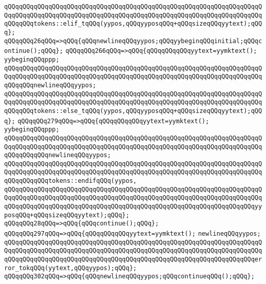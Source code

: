 \verb|qQQqqQQqqQQqqQQqqQQqqQQqqQQqqQQqqQQqqQQqqQQqqQQqqQQqqQQqqQQqqQQqqQQqqQQqqQQqqQQqqQQqqQQqqQQqqQQqqQQqqQQqqQQqqQQqqQQqqQQqqQQqqQQqqQQqqQQqqQQqqQQqqQQqtokens::elif_tqQQq(yypos,qQQqyyposqQQq+qQQqsizeqQQqyytext);qQQq};|\newline
\verb|qQQqqQQq26qQQq=>qQQq{qQQqnewlineqQQqyypos;qQQqyybeginqQQqinitial;qQQqcontinue();qQQq};|\newline
\verb|qQQqqQQq266qQQq=>qQQq{qQQqqQQqqQQqyytext=yymktext();|\newline
\verb|yybeginqQQqppp;|\newline
\verb|qQQqqQQqqQQqqQQqqQQqqQQqqQQqqQQqqQQqqQQqqQQqqQQqqQQqqQQqqQQqqQQqqQQqqQQqqQQqqQQqqQQqqQQqqQQqqQQqqQQqqQQqqQQqqQQqqQQqqQQqqQQqqQQqqQQqqQQqqQQqqQQqqQQqnewlineqQQqyypos;|\newline
\verb|qQQqqQQqqQQqqQQqqQQqqQQqqQQqqQQqqQQqqQQqqQQqqQQqqQQqqQQqqQQqqQQqqQQqqQQqqQQqqQQqqQQqqQQqqQQqqQQqqQQqqQQqqQQqqQQqqQQqqQQqqQQqqQQqqQQqqQQqqQQqqQQqqQQqtokens::else_tqQQq(yypos,qQQqyyposqQQq+qQQqsizeqQQqyytext);qQQq};|\newline
\verb|qQQqqQQq279qQQq=>qQQq{qQQqqQQqqQQqyytext=yymktext();|\newline
\verb|yybeginqQQqppp;|\newline
\verb|qQQqqQQqqQQqqQQqqQQqqQQqqQQqqQQqqQQqqQQqqQQqqQQqqQQqqQQqqQQqqQQqqQQqqQQqqQQqqQQqqQQqqQQqqQQqqQQqqQQqqQQqqQQqqQQqqQQqqQQqqQQqqQQqqQQqqQQqqQQqqQQqqQQqqQQqnewlineqQQqyypos;|\newline
\verb|qQQqqQQqqQQqqQQqqQQqqQQqqQQqqQQqqQQqqQQqqQQqqQQqqQQqqQQqqQQqqQQqqQQqqQQqqQQqqQQqqQQqqQQqqQQqqQQqqQQqqQQqqQQqqQQqqQQqqQQqqQQqqQQqqQQqqQQqqQQqqQQqqQQqqQQqtokens::endifqQQq(yypos,|\newline
\verb|qQQqqQQqqQQqqQQqqQQqqQQqqQQqqQQqqQQqqQQqqQQqqQQqqQQqqQQqqQQqqQQqqQQqqQQqqQQqqQQqqQQqqQQqqQQqqQQqqQQqqQQqqQQqqQQqqQQqqQQqqQQqqQQqqQQqqQQqqQQqqQQqqQQqqQQqqQQqqQQqqQQqqQQqqQQqqQQqqQQqqQQqqQQqqQQqqQQqqQQqqQQqqQQqyyposqQQq+qQQqsizeqQQqyytext);qQQq};|\newline
\verb|qQQqqQQq28qQQq=>qQQq{qQQqcontinue();qQQq};|\newline
\verb|qQQqqQQq297qQQq=>qQQq{qQQqqQQqqQQqyytext=yymktext();|\newline
\verb|newlineqQQqyypos;|\newline
\verb|qQQqqQQqqQQqqQQqqQQqqQQqqQQqqQQqqQQqqQQqqQQqqQQqqQQqqQQqqQQqqQQqqQQqqQQqqQQqqQQqqQQqqQQqqQQqqQQqqQQqqQQqqQQqqQQqqQQqqQQqqQQqqQQqqQQqqQQqqQQqqQQqqQQqqQQqqQQqqQQqqQQqqQQqqQQqqQQqqQQqqQQqqQQqqQQqqQQqqQQqqQQqqQQqerror_tokqQQq(yytext,qQQqyypos);qQQq};|\newline
\verb|qQQqqQQq302qQQq=>qQQq{qQQqnewlineqQQqyypos;qQQqcontinueqQQq();qQQq};|\newline
